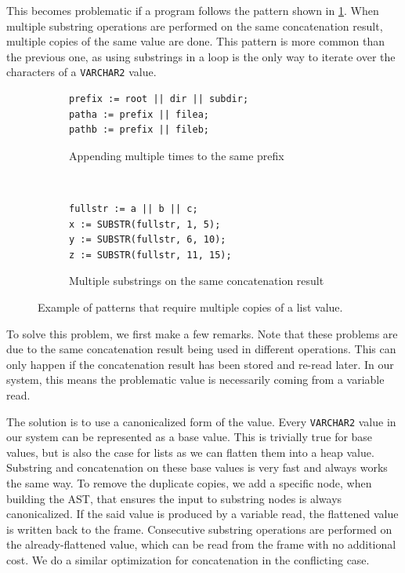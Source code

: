 \documentclass[twoside,11pt,a4paper]{article}
\newcommand{\pls}[1]{\small\texttt{#1}\normalsize}
\newcommand{\plstype}[1]{\pls{#1}}
\newcommand{\varchar}{\plstype{VARCHAR2}}
\begin{document}

This becomes problematic if a program follows the pattern shown in \ref{fig:substrcanonpattern}. When multiple substring operations are performed on the same concatenation result, multiple copies of the same value are done. This pattern is more common than the previous one, as using substrings in a loop is the only way to iterate over the characters of a \varchar{} value.

\begin{figure}[tb]
	\begin{subfigure}[h]{\textwidth}
		\begin{lstlisting}[style=PLSQL, frame=L]
prefix := root || dir || subdir;
patha := prefix || filea;
pathb := prefix || fileb;
		\end{lstlisting}
		\caption{Appending multiple times to the same prefix}
	\end{subfigure}
	\,
	\begin{subfigure}[h]{\textwidth}
		\begin{lstlisting}[style=PLSQL, frame=L]
fullstr := a || b || c;
x := SUBSTR(fullstr, 1, 5);
y := SUBSTR(fullstr, 6, 10);
z := SUBSTR(fullstr, 11, 15);
		\end{lstlisting}
		\caption{Multiple substrings on the same concatenation result}
		\label{fig:substrcanonpattern}
	\end{subfigure}
	
	\caption{Example of patterns that require multiple copies of a list value.}
	\label{fig:canonpatterns}
\end{figure}

To solve this problem, we first make a few remarks. Note that these problems are due to the same concatenation result being used in different operations. This can only happen if the concatenation result has been stored and re-read later. In our system, this means the problematic value is necessarily coming from a variable read.

The solution is to use a canonicalized form of the value. Every \varchar{} value in our system can be represented as a base value. This is trivially true for base values, but is also the case for lists as we can flatten them into a heap value. Substring and concatenation on these base values is very fast and always works the same way. To remove the duplicate copies, we add a specific node, when building the AST, that ensures the input to substring nodes is always canonicalized. If the said value is produced by a variable read, the flattened value is written back to the frame. Consecutive substring operations are performed on the already-flattened value, which can be read from the frame with no additional cost. We do a similar optimization for concatenation in the conflicting case.
\end{document}
